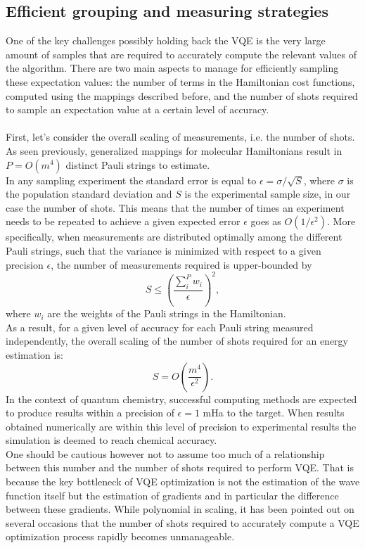 \subsection{Efficient grouping and measuring strategies}
One of the key challenges possibly holding back the VQE is the very large amount of samples that are required to accurately compute the relevant values of the algorithm. There are two main aspects to manage for efficiently sampling these expectation values: the number of terms in the Hamiltonian cost functions, computed using the mappings described before, and the number of shots required to sample an expectation value at a certain level of accuracy. \\
\\
First, let's consider the overall scaling of measurements, i.e. the number of shots. \\
As seen previously, generalized mappings for molecular Hamiltonians result in $P = O(m^4)$ distinct Pauli strings to estimate. \\
In any sampling experiment the standard error is equal to $\epsilon = \sigma / \sqrt{S}$, where $\sigma$ is the population standard deviation and $S$ is the experimental sample size, in our case the number of shots. This means that the number of times an experiment needs to be repeated to achieve a given expected error $\epsilon$ goes as $O(1/\epsilon^2)$. More specifically, when measurements are distributed optimally among the different Pauli strings, such that the variance is minimized with respect to a given precision $\epsilon$, the number of measurements required is upper-bounded by
\begin{equation}
S \leq \left( \frac{\sum_i^P w_i}{\epsilon} \right)^2,
\end{equation}
where $w_i$ are the weights of the Pauli strings in the Hamiltonian. \\
As a result, for a given level of accuracy for each Pauli string measured independently, the overall scaling of the number of shots required for an energy estimation is:
\begin{equation}
    S = O \left( \frac{m^4}{\epsilon^2} \right).
\end{equation}
In the context of quantum chemistry, successful computing methods are expected to produce results within a precision of $\epsilon = 1$ mHa to the target. When results obtained numerically are within this level of precision to experimental results the simulation is deemed to reach chemical accuracy. \\
One should be cautious however not to assume too much of a relationship between this number and the number of shots required to perform VQE. That is because the key bottleneck of VQE optimization is not the estimation of the wave function itself but the estimation of gradients and in particular the difference between these gradients. While polynomial in scaling, it has been pointed out on several occasions that the number of shots required to accurately compute a VQE optimization process rapidly becomes unmanageable.

